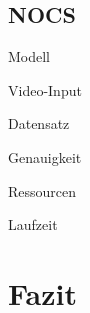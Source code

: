 \documentclass[a4paper, 11pt]{article}
\begin{document}
\begin{multicols*}{2}
    \subsection{NOCS}

    \begin{description*}
        \item[Modell]
        \item[Video-Input]
        \item[Datensatz]
        \item[Genauigkeit]
        \begin{itemize*}
            \item
        \end{itemize*}
        \item[Ressourcen]
        \item[Laufzeit]
    \end{description*}


    \section{Fazit}

\end{multicols*}
\end{document}
